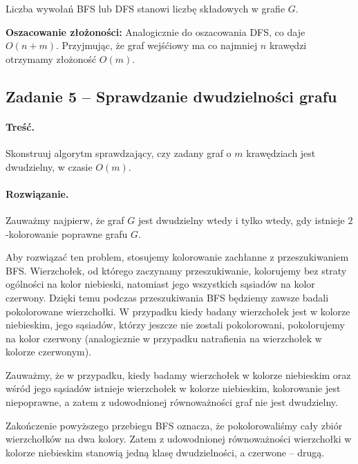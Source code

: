 Liczba wywołań BFS lub DFS stanowi liczbę składowych w grafie $G$.

\textbf{Oszacowanie złożoności:} Analogicznie do oszacowania DFS, co daje $O(n + m)$. Przyjmując, że
graf wejśćiowy ma co najmniej $n$ krawędzi otrzymamy złożoność  $O(m)$.

\subsection{Zadanie 5 -- Sprawdzanie dwudzielności grafu}
\label{exc:bipart}
\paragraph{Treść.} Skonstruuj algorytm sprawdzający, 
czy zadany graf o $m$ krawędziach jest dwudzielny, w czasie $O(m)$.

\paragraph{Rozwiązanie.} Zauważmy najpierw, że 
graf $G$ jest dwudzielny wtedy i tylko wtedy, gdy istnieje $2$-kolorowanie
poprawne grafu $G$.  

Aby rozwiązać ten problem, stosujemy kolorowanie 
zachłanne z przeszukiwaniem BFS. 
Wierzchołek, od którego zaczynamy przeszukiwanie, kolorujemy bez straty
ogólności na kolor niebieski, natomiast jego wszystkich sąsiadów na kolor czerwony.
Dzięki temu podczas przeszukiwania BFS będziemy zawsze badali pokolorowane 
wierzchołki. W przypadku kiedy badany wierzchołek jest w kolorze niebieskim, jego 
sąsiadów, którzy jeszcze nie zostali pokolorowani, pokolorujemy na kolor czerwony (analogicznie
w przypadku natrafienia na wierzchołek w kolorze czerwonym).

Zauważmy, że w przypadku, kiedy badamy wierzchołek w kolorze niebieskim oraz wśród jego sąsiadów
istnieje wierzchołek w kolorze niebieskim, kolorowanie jest niepoprawne, a zatem z udowodnionej 
równoważności graf nie jest dwudzielny.

Zakończenie powyższego przebiegu BFS oznacza, że pokolorowaliśmy cały zbiór wierzchołków na
dwa kolory. Zatem z udowodnionej równoważności
wierzchołki w kolorze niebieskim stanowią jedną klasę dwudzielności, a czerwone -- drugą.

